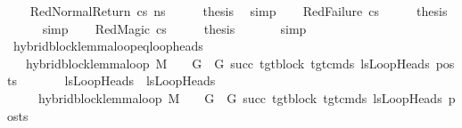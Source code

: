 \begin{isabellebody}
\ \ \isamarkupfalse%
\ {\isacharparenleft}{\kern0pt}RedNormalReturn\ cs\ ns{\isacharprime}{\kern0pt}{\isacharparenright}{\kern0pt}\isanewline
\ \ \isamarkupfalse%
\ \isamarkupfalse%
\ {\isacharquery}{\kern0pt}thesis\ \isamarkupfalse%
\ simp\isanewline
{}\isamarkupfalse%
\isanewline
\ \ \isamarkupfalse%
\ {\isacharparenleft}{\kern0pt}RedFailure\ cs{\isacharparenright}{\kern0pt}\isanewline
\ \ \isamarkupfalse%
\ \isamarkupfalse%
\ {\isacharquery}{\kern0pt}thesis\ \isanewline
\ \ \ \ \isamarkupfalse%
\ simp\isanewline
{}\isamarkupfalse%
\isanewline
\ \ \isamarkupfalse%
\ {\isacharparenleft}{\kern0pt}RedMagic\ cs{\isacharparenright}{\kern0pt}\isanewline
\ \ \isamarkupfalse%
\ \isamarkupfalse%
\ {\isacharquery}{\kern0pt}thesis\ \isanewline
\ \ \ \ \isamarkupfalse%
\ simp\isanewline
{}\isamarkupfalse%
%
\endisatagproof
{\isafoldproof}%
%
\isadelimproof
\isanewline
%
\endisadelimproof
\isanewline
{}\isamarkupfalse%
\ hybrid{\isacharunderscore}{\kern0pt}block{\isacharunderscore}{\kern0pt}lemma{\isacharunderscore}{\kern0pt}loop{\isacharunderscore}{\kern0pt}eq{\isacharunderscore}{\kern0pt}loop{\isacharunderscore}{\kern0pt}heads{\isacharcolon}{\kern0pt}\isanewline
\ \ \ {\isachardoublequoteopen}hybrid{\isacharunderscore}{\kern0pt}block{\isacharunderscore}{\kern0pt}lemma{\isacharunderscore}{\kern0pt}loop\ M\ {\isasymLambda}\ {\isasymGamma}\ {\isasymOmega}\ G\ \ G{\isacharprime}{\kern0pt}\ succ\ tgt{\isacharunderscore}{\kern0pt}block\ tgt{\isacharunderscore}{\kern0pt}cmds{\isacharunderscore}{\kern0pt}{}\ lsLoopHeads{}\ posts{\isachardoublequoteclose}\isanewline
\ \ \ \ \ \ \ {\isachardoublequoteopen}lsLoopHeads{}\ {\isacharequal}{\kern0pt}\ lsLoopHeads{}{\isachardoublequoteclose}\isanewline
\ \ \ \ \ {\isachardoublequoteopen}hybrid{\isacharunderscore}{\kern0pt}block{\isacharunderscore}{\kern0pt}lemma{\isacharunderscore}{\kern0pt}loop\ M\ {\isasymLambda}\ {\isasymGamma}\ {\isasymOmega}\ G\ \ G{\isacharprime}{\kern0pt}\ succ\ tgt{\isacharunderscore}{\kern0pt}block\ tgt{\isacharunderscore}{\kern0pt}cmds{\isacharunderscore}{\kern0pt}{}\ lsLoopHeads{}\ posts{\isachardoublequoteclose}\isanewline
%
\isadelimproof
\ \ %
\endisadelimproof

\end{isabellebody}
